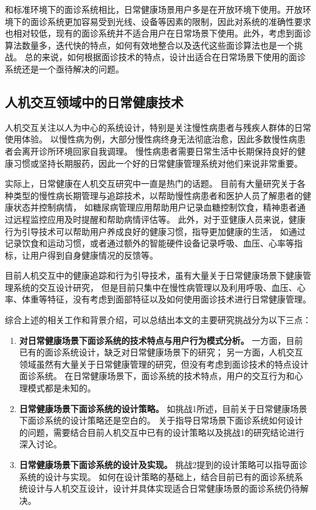 和标准环境下的面诊系统相比，日常健康场景用户多是在开放环境下使用。开放环境下的面诊系统更加容易受到光线、设备等因素的限制，因此对系统的准确性要求也相对较低，现有的面诊系统并不适合用户在日常场景下使用。此外，考虑到面诊算法数量多，迭代快的特点，如何有效地整合以及迭代这些面诊算法也是一个挑战。
总的来说，如何根据面诊技术的特点，设计出适合在日常场景下使用的面诊系统还是一个亟待解决的问题。

\subsection{人机交互领域中的日常健康技术}
人机交互关注以人为中心的系统设计，特别是关注慢性病患者与残疾人群体的日常使用体验。
以慢性病为例，大部分慢性病终身无法彻底治愈，因此多数慢性病患者会离开诊所环境回家自我调理。
慢性病患者需要日常生活中长期保持良好的健康习惯或坚持长期服药，因此一个好的日常健康管理系统对他们来说非常重要。

实际上，日常健康在人机交互研究中一直是热门的话题。
目前有大量研究关于各种类型的慢性病长期管理与追踪技术，以帮助慢性病患者和医护人员了解患者的健康状态并控制病情，
如糖尿病管理应用帮助用户记录血糖控制饮食\cite{burgermaster2019personal}，精神患者通过远程监控应用及时提醒和帮助病情评估\cite{lazar2016evaluation}等。
此外，对于亚健康人员来说，健康行为引导技术可以帮助用户养成良好的健康习惯，指导更加健康的生活，
如通过记录饮食和运动习惯，或者通过额外的智能硬件设备记录呼吸、血压、心率等指标\cite{kay2012lullaby,gronvall2013beyond}，让用户得到自身健康情况的反馈等。

目前人机交互中的健康追踪和行为引导技术，虽有大量关于日常健康场景下健康管理系统的交互设计研究，
但是目前只集中在慢性病管理以及利用呼吸、血压、心率、体重等特征，没有考虑到面部特征以及如何使用面诊技术进行日常健康管理。

综合上述的相关工作和背景介绍，可以总结出本文的主要研究挑战分为以下三点：

\begin{enumerate}
    \item \textbf{对日常健康场景下面诊系统的技术特点与用户行为模式分析。}
    一方面，目前已有的面诊系统设计，缺乏对日常健康场景下的研究；
    另一方面，人机交互领域虽然有大量关于日常健康管理的研究，但没有考虑到面诊技术的特点设计面诊系统。
    在日常健康场景下，面诊系统的技术特点，用户的交互行为和心理模式都是未知的。

    \item \textbf{日常健康场景下面诊系统的设计策略。}
    如挑战1所述，目前关于日常健康场景下面诊系统的设计策略还是空白的。
    关于指导日常场景下面诊系统如何设计的问题，需要结合目前人机交互中已有的设计策略以及挑战1的研究结论进行深入讨论。

    \item \textbf{日常健康场景下面诊系统的设计及实现。}
    挑战2提到的设计策略可以指导面诊系统的设计与实现。
    如何在设计策略的基础上，结合目前已有的面诊系统系统设计与人机交互设计，设计并具体实现适合日常健康场景的面诊系统仍待解决。
    
\end{enumerate}

